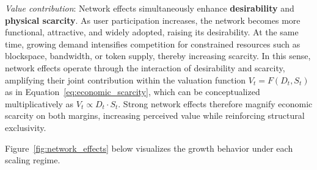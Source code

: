 \documentclass[12pt]{article}
\begin{document}
\textit{Value contribution}: Network effects simultaneously enhance \textbf{desirability} and \textbf{physical scarcity}. As user participation increases, the network becomes more functional, attractive, and widely adopted, raising its desirability. At the same time, growing demand intensifies competition for constrained resources such as blockspace, bandwidth, or token supply, thereby increasing scarcity. In this sense, network effects operate through the interaction of desirability and scarcity, amplifying their joint contribution within the valuation function \( V_t = F(D_t, S_t) \) as in Equation~\ref{eq:economic_scarcity}, which can be conceptualized multiplicatively as \( V_t \propto D_t \cdot S_t \). Strong network effects therefore magnify economic scarcity on both margins, increasing perceived value while reinforcing structural exclusivity.



Figure~\ref{fig:network_effects} below visualizes the growth behavior under each scaling regime.
\end{document}
